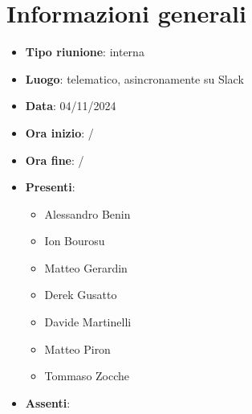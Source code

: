 \section{Informazioni generali}
\begin{itemize}
  \item \textbf{Tipo riunione}: interna
  \item \textbf{Luogo}: telematico, asincronamente su Slack
  \item \textbf{Data}: 04/11/2024
  \item \textbf{Ora inizio}: /
  \item \textbf{Ora fine}: /
  
  \item \textbf{Presenti}:
  \begin{itemize}
    \item Alessandro Benin
    \item Ion Bourosu
    \item Matteo Gerardin
    \item Derek Gusatto
    \item Davide Martinelli
    \item Matteo Piron
    \item Tommaso Zocche
  \end{itemize}

  \item \textbf{Assenti}:
 
\end{itemize}